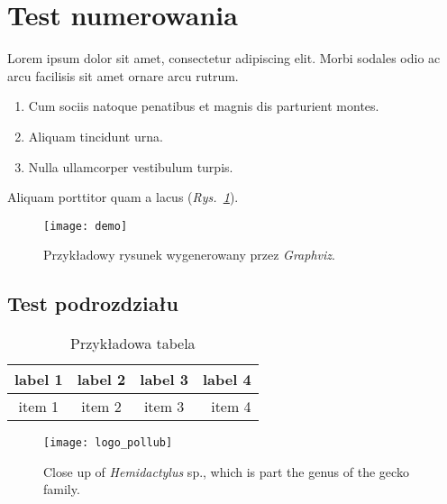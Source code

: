 \section{Test numerowania}

Lorem ipsum dolor sit amet, consectetur adipiscing elit.\cite{test1} Morbi sodales odio ac arcu facilisis sit amet ornare arcu rutrum.\cite{test1,test2}

\begin{enumerate}
  \item{Cum sociis natoque penatibus et magnis dis parturient montes.}
  \item{Aliquam tincidunt urna.}
  \item{Nulla ullamcorper vestibulum turpis.}
\end{enumerate}

\lipsum[2]

\przyklad \lipsum[12] 

\noindent Aliquam porttitor quam a lacus (\emph{Rys.~\ref{fig:gfx-demo-1}}).


\begin{figure}[h!tb]
  \label{fig:gfx-demo-1}
  \centering
  \texttt{[image: demo]}
  \caption[Przykładowy rysunek]%
  {Przykładowy rysunek wygenerowany przez \emph{Graphviz}.}
\end{figure}

\subsection{Test podrozdziału}

\lipsum[3]

\begin{table}[h!tb]
  \center
  \caption{Przykładowa tabela}
  \label{my_table}
  \begin{tabular}{ | c | c | c | r | }
    \hline
  label 1 & label 2 & label 3 & label 4 \\
  \hline
  item 1  & item 2  & item 3  & item 4  \\
  \hline
  \end{tabular}
\end{table}

\lipsum[4]

\begin{figure}[h!tb]
  \centering
  \texttt{[image: logo\_pollub]}
  \caption[Close up of \textit{Hemidactylus} sp.]%
  {Close up of \textit{Hemidactylus} sp., which is
  part the genus of the gecko family.}
\end{figure}

